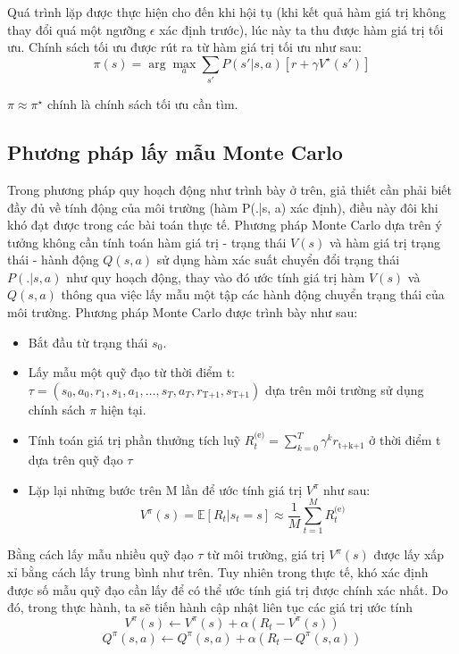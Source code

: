 \documentclass{uetgraduation}
\begin{document}
Quá trình lặp được thực hiện cho đến khi hội tụ (khi kết quả hàm giá trị không thay đổi quá một ngưỡng $\epsilon$ xác định trước), lúc này ta thu được hàm giá trị
tối ưu. Chính sách tối ưu được rút ra từ hàm giá trị tối ưu như sau:
\begin{equation}
    \pi (s) = \arg \max_a \sum_{s'} P(s'|s, a) [r + \gamma V^\star (s')]
\end{equation}

$\pi \approx \pi^\star$ chính là chính sách tối ưu cần tìm.

\subsection{Phương pháp lấy mẫu Monte Carlo}
Trong phương pháp quy hoạch động như trình bày ở trên, giả thiết cần phải biết đầy đủ về tính động của môi trường (hàm P(.|s, a) xác định), điều này đôi khi khó đạt được
trong các bài toán thực tế. Phương pháp Monte Carlo dựa trên ý tưởng không cần tính toán hàm giá trị - trạng thái $V(s)$ và hàm giá trị trạng thái - hành động
$Q(s,a)$ sử dụng hàm xác suất chuyển đổi trạng thái $P(.|s, a)$ như quy hoạch động, thay vào đó ước tính giá trị hàm $V(s)$ và $Q(s,a)$ thông qua việc lấy mẫu
một tập các hành động chuyển trạng thái của môi trường. Phương pháp Monte Carlo được trình bày như sau:
\begin{itemize}
    \item Bắt đầu từ trạng thái $s_0$.
    \item Lấy mẫu một quỹ đạo từ thời điểm t: $\tau = (s_0, a_0, r_1, s_1, a_1, \dots, s_T, a_T, r_\text{T+1}, s_\text{T+1})$ dựa trên môi trường sử dụng chính
    sách $\pi$ hiện tại.
    \item Tính toán giá trị phần thưởng tích luỹ $R_t^\text{(e)} = \sum_{k=0}^{T} \gamma^k r_\text{t+k+1}$ ở thời điểm t dựa trên quỹ đạo $\tau$
    \item Lặp lại những bước trên M lần để ước tính giá trị $V^\pi$ như sau:
    \begin{equation}
        V^\pi (s) = \mathbb{E} [R_t | s_t = s] \approx \frac{1}{M} \sum_{t=1}^{M} R_t^\text{(e)}
    \end{equation}
\end{itemize}

Bằng cách lấy mẫu nhiều quỹ đạo $\tau$ từ môi trường, giá trị $V^\pi (s)$ được lấy xấp xỉ bằng cách lấy trung bình như trên. Tuy nhiên trong thực tế, khó xác
định được số mẫu quỹ đạo cần lấy để có thể ước tính giá trị được chính xác nhất. Do đó, trong thực hành, ta sẽ tiến hành cập nhật liên tục các giá trị ước tính
\begin{equation}
    V^\pi (s) \leftarrow V^\pi (s) + \alpha (R_t - V^\pi (s))
\end{equation}
\begin{equation}
    Q^\pi (s, a) \leftarrow Q^\pi (s, a) + \alpha (R_t - Q^\pi (s, a))
\end{equation}
\end{document}
